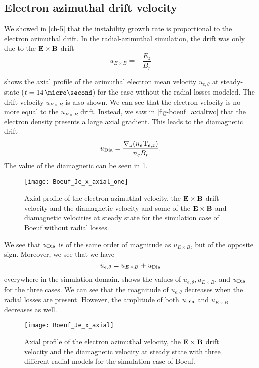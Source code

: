 \subsection{Electron azimuthal drift velocity} \label{subsec-drift}

We showed in \cref{ch-5} that the instability growth rate is proportional to the electron azimuthal drift.
In the radial-azimuthal simulation, the drift was only due to the ${\mathbf E} \times {\mathbf B}$ drift
\begin{equation} \label{eq-exbdrift}
  u_{E \times B} = - \frac{E_z}{B_r}
\end{equation}

 shows the axial profile of the azimuthal electron mean velocity $u_{e, \theta}$ at steady-state ($t = 14\,\micro\second$) for the case without the radial losses modeled.
The drift velocity $u_{E \times B}$ is also shown.
We can see that the electron velocity is no more equal to the $u_{E \times B}$ drift.
Instead, we saw in \cref{fig-boeuf_axialtwo} that the electron density presents a large axial gradient.
This leads to the diamagnetic drift
$$u_{\rm Dia}=\frac{\nabla_z (n_e {\rm T}_{e,z})}{n_e B_r}.$$
The value of the diamagnetic can be seen in \cref{fig-Jetheta_sum}.


\begin{figure}[hbtp]
  \centering
  \texttt{[image: Boeuf\_Je\_x\_axial\_one]}
  \caption{Axial profile of the electron azimuthal velocity, the ${\mathbf E} \times {\mathbf B}$ drift velocity and the diamagnetic velocity and some of the ${\mathbf E} \times {\mathbf B}$ and diamagnetic velocities at steady state for the simulation case of Boeuf without radial losses.}
  \label{fig-Jetheta_sum}
\end{figure}

We see that $u_{\rm Dia}$ is of the same order of magnitude as $u_{E \times B}$, but of the opposite sign.
Moreover, we see that we have 
$$ u_{e, \theta} =   u_{E \times B} + u_{\rm Dia}$$
everywhere in the simulation domain.
 shows the values of $ u_{e, \theta},   u_{E \times B}$, and $u_{\rm Dia}$ for the three cases.
We can see that the magnitude of $u_{e, \theta} $ decreases when the radial losses are present.
However, the amplitude of both $u_{\rm Dia}$ and $u_{E \times B}$ decreases as well.

 
\begin{figure}[hbtp]
  \centering
  \texttt{[image: Boeuf\_Je\_x\_axial]}
  \caption{Axial profile of the electron azimuthal velocity, the ${\mathbf E} \times {\mathbf B}$ drift velocity and the diamagnetic velocity at steady state with three different radial models for the simulation case of Boeuf.}
  \label{fig-Jetheta}
\end{figure}

